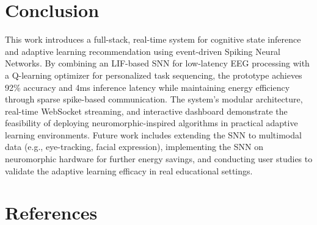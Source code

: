 \documentclass[conference]{IEEEtran}
\begin{document}
\section{Conclusion}
\label{conclusion}
This work introduces a full-stack, real-time system for cognitive state inference and adaptive learning recommendation using event-driven Spiking Neural Networks. By combining an LIF-based SNN for low-latency EEG processing with a Q-learning optimizer for personalized task sequencing, the prototype achieves 92\% accuracy and 4ms inference latency while maintaining energy efficiency through sparse spike-based communication. The system's modular architecture, real-time WebSocket streaming, and interactive dashboard demonstrate the feasibility of deploying neuromorphic-inspired algorithms in practical adaptive learning environments. Future work includes extending the SNN to multimodal data (e.g., eye-tracking, facial expression), implementing the SNN on neuromorphic hardware for further energy savings, and conducting user studies to validate the adaptive learning efficacy in real educational settings.

\section*{References}


\end{document}

